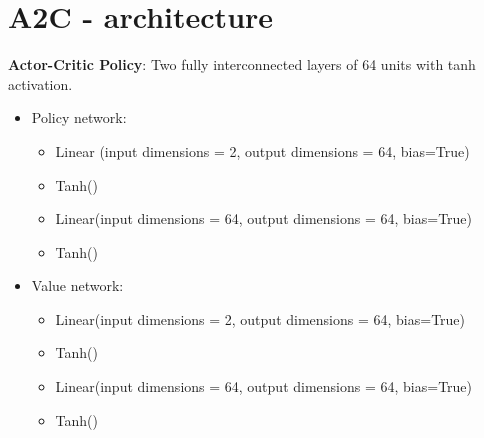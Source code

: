 \documentclass[]{article}
\newcommand{\rowspace}[1]{\renewcommand{\arraystretch}{#1}}
\begin{document}
\section{A2C - architecture}
\textbf{Actor-Critic Policy}: Two fully interconnected layers of 64 units with tanh activation.
\begin{itemize}
	\item Policy network:
	\begin{itemize}
		\item Linear (input dimensions = 2, output dimensions = 64, bias=True)
		\item Tanh()
		\item Linear(input dimensions = 64, output dimensions = 64, bias=True)
		\item Tanh()
	\end{itemize}

	\item Value network:
	\begin{itemize}
		\item Linear(input dimensions = 2, output dimensions = 64, bias=True)
		\item Tanh()
		\item Linear(input dimensions = 64, output dimensions = 64, bias=True)
		\item Tanh()
	\end{itemize}
\end{itemize}


%		
\newpage
\end{document}
